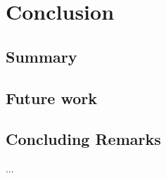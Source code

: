 \chapter{Conclusion}
\label{sec:conclusion}

\section{Summary}
\label{sec:conclusion:summary}

\section{Future work}
\label{sec:conclusion:future}

\section{Concluding Remarks}
\label{sec:conclusion:remarks}
...
